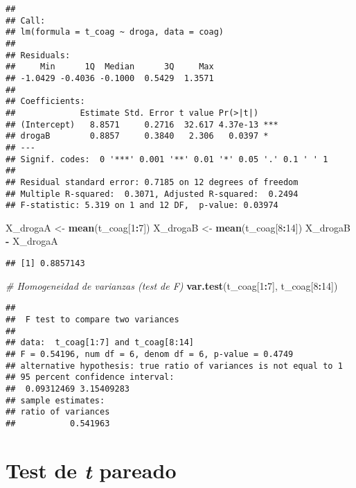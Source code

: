 \documentclass[
]{book}
\newenvironment{Shaded}{\begin{snugshade}}{\end{snugshade}}
\newcommand{\CommentTok}[1]{\textcolor[rgb]{0.56,0.35,0.01}{\textit{#1}}}
\newcommand{\DecValTok}[1]{\textcolor[rgb]{0.00,0.00,0.81}{#1}}
\newcommand{\KeywordTok}[1]{\textcolor[rgb]{0.13,0.29,0.53}{\textbf{#1}}}
\newcommand{\NormalTok}[1]{#1}
\newcommand{\OperatorTok}[1]{\textcolor[rgb]{0.81,0.36,0.00}{\textbf{#1}}}
\newcommand{\StringTok}[1]{\textcolor[rgb]{0.31,0.60,0.02}{#1}}
\begin{document}
\begin{verbatim}
## 
## Call:
## lm(formula = t_coag ~ droga, data = coag)
## 
## Residuals:
##     Min      1Q  Median      3Q     Max 
## -1.0429 -0.4036 -0.1000  0.5429  1.3571 
## 
## Coefficients:
##             Estimate Std. Error t value Pr(>|t|)    
## (Intercept)   8.8571     0.2716  32.617 4.37e-13 ***
## drogaB        0.8857     0.3840   2.306   0.0397 *  
## ---
## Signif. codes:  0 '***' 0.001 '**' 0.01 '*' 0.05 '.' 0.1 ' ' 1
## 
## Residual standard error: 0.7185 on 12 degrees of freedom
## Multiple R-squared:  0.3071, Adjusted R-squared:  0.2494 
## F-statistic: 5.319 on 1 and 12 DF,  p-value: 0.03974
\end{verbatim}

\begin{Shaded}
\begin{Highlighting}[]
\NormalTok{X_drogaA <-}\StringTok{ }\KeywordTok{mean}\NormalTok{(t_coag[}\DecValTok{1}\OperatorTok{:}\DecValTok{7}\NormalTok{])}
\NormalTok{X_drogaB <-}\StringTok{ }\KeywordTok{mean}\NormalTok{(t_coag[}\DecValTok{8}\OperatorTok{:}\DecValTok{14}\NormalTok{])}
\NormalTok{X_drogaB }\OperatorTok{-}\StringTok{ }\NormalTok{X_drogaA}
\end{Highlighting}
\end{Shaded}

\begin{verbatim}
## [1] 0.8857143
\end{verbatim}

\begin{Shaded}
\begin{Highlighting}[]
\CommentTok{# Homogeneidad de varianzas (test de F)}
\KeywordTok{var.test}\NormalTok{(t_coag[}\DecValTok{1}\OperatorTok{:}\DecValTok{7}\NormalTok{], t_coag[}\DecValTok{8}\OperatorTok{:}\DecValTok{14}\NormalTok{])}
\end{Highlighting}
\end{Shaded}

\begin{verbatim}
## 
##  F test to compare two variances
## 
## data:  t_coag[1:7] and t_coag[8:14]
## F = 0.54196, num df = 6, denom df = 6, p-value = 0.4749
## alternative hypothesis: true ratio of variances is not equal to 1
## 95 percent confidence interval:
##  0.09312469 3.15409283
## sample estimates:
## ratio of variances 
##           0.541963
\end{verbatim}

\hypertarget{test-de-t-pareado}{%
\section{\texorpdfstring{Test de \emph{t} pareado}{Test de t pareado}}\label{test-de-t-pareado}}
\end{document}
